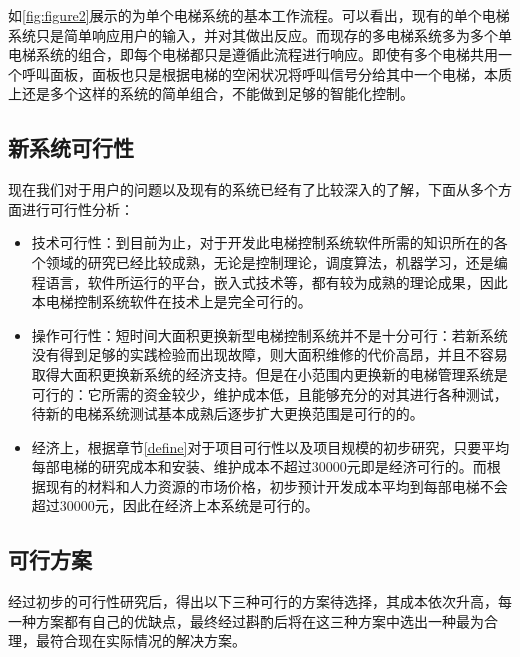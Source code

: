 如\ref{fig:figure2}展示的为单个电梯系统的基本工作流程。可以看出，现有的单个电梯系统只是简单响应用户的输入，并对其做出反应。而现存的多电梯系统多为多个单电梯系统的组合，即每个电梯都只是遵循此流程进行响应。即使有多个电梯共用一个呼叫面板，面板也只是根据电梯的空闲状况将呼叫信号分给其中一个电梯，本质上还是多个这样的系统的简单组合，不能做到足够的智能化控制。

\subsection{新系统可行性}
现在我们对于用户的问题以及现有的系统已经有了比较深入的了解，下面从多个方面进行可行性分析：
\begin{itemize}
	\item 技术可行性：到目前为止，对于开发此电梯控制系统软件所需的知识所在的各个领域的研究已经比较成熟，无论是控制理论，调度算法，机器学习，还是编程语言，软件所运行的平台，嵌入式技术等，都有较为成熟的理论成果，因此本电梯控制系统软件在技术上是完全可行的。
	\item 操作可行性：短时间大面积更换新型电梯控制系统并不是十分可行：若新系统没有得到足够的实践检验而出现故障，则大面积维修的代价高昂，并且不容易取得大面积更换新系统的经济支持。但是在小范围内更换新的电梯管理系统是可行的：它所需的资金较少，维护成本低，且能够充分的对其进行各种测试，待新的电梯系统测试基本成熟后逐步扩大更换范围是可行的的。
	\item 经济上，根据章节\ref{define}对于项目可行性以及项目规模的初步研究，只要平均每部电梯的研究成本和安装、维护成本不超过30000元即是经济可行的。而根据现有的材料和人力资源的市场价格，初步预计开发成本平均到每部电梯不会超过30000元，因此在经济上本系统是可行的。
\end{itemize}

\subsection{可行方案}
经过初步的可行性研究后，得出以下三种可行的方案待选择，其成本依次升高，每一种方案都有自己的优缺点，最终经过斟酌后将在这三种方案中选出一种最为合理，最符合现在实际情况的解决方案。

